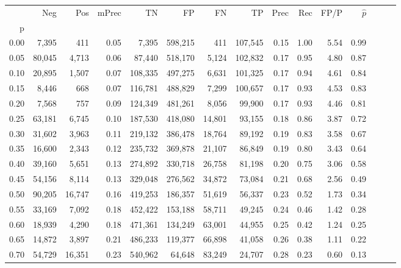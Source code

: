 \begin{tabular}{rrrrrrrrrrrrrrr}
\toprule
{} &     Neg &     Pos & mPrec &       TN &       FP &       FN &       TP &  Prec &   Rec &  FP/P & $\hat{p}$ \\
p    &         &         &       &          &          &          &          &       &       &       &           \\
\midrule
0.00 &   7,395 &     411 &  0.05 &    7,395 &  598,215 &      411 &  107,545 &  0.15 &  1.00 &  5.54 &      0.99 \\
0.05 &  80,045 &   4,713 &  0.06 &   87,440 &  518,170 &    5,124 &  102,832 &  0.17 &  0.95 &  4.80 &      0.87 \\
0.10 &  20,895 &   1,507 &  0.07 &  108,335 &  497,275 &    6,631 &  101,325 &  0.17 &  0.94 &  4.61 &      0.84 \\
0.15 &   8,446 &     668 &  0.07 &  116,781 &  488,829 &    7,299 &  100,657 &  0.17 &  0.93 &  4.53 &      0.83 \\
0.20 &   7,568 &     757 &  0.09 &  124,349 &  481,261 &    8,056 &   99,900 &  0.17 &  0.93 &  4.46 &      0.81 \\
0.25 &  63,181 &   6,745 &  0.10 &  187,530 &  418,080 &   14,801 &   93,155 &  0.18 &  0.86 &  3.87 &      0.72 \\
0.30 &  31,602 &   3,963 &  0.11 &  219,132 &  386,478 &   18,764 &   89,192 &  0.19 &  0.83 &  3.58 &      0.67 \\
0.35 &  16,600 &   2,343 &  0.12 &  235,732 &  369,878 &   21,107 &   86,849 &  0.19 &  0.80 &  3.43 &      0.64 \\
0.40 &  39,160 &   5,651 &  0.13 &  274,892 &  330,718 &   26,758 &   81,198 &  0.20 &  0.75 &  3.06 &      0.58 \\
0.45 &  54,156 &   8,114 &  0.13 &  329,048 &  276,562 &   34,872 &   73,084 &  0.21 &  0.68 &  2.56 &      0.49 \\
0.50 &  90,205 &  16,747 &  0.16 &  419,253 &  186,357 &   51,619 &   56,337 &  0.23 &  0.52 &  1.73 &      0.34 \\
0.55 &  33,169 &   7,092 &  0.18 &  452,422 &  153,188 &   58,711 &   49,245 &  0.24 &  0.46 &  1.42 &      0.28 \\
0.60 &  18,939 &   4,290 &  0.18 &  471,361 &  134,249 &   63,001 &   44,955 &  0.25 &  0.42 &  1.24 &      0.25 \\
0.65 &  14,872 &   3,897 &  0.21 &  486,233 &  119,377 &   66,898 &   41,058 &  0.26 &  0.38 &  1.11 &      0.22 \\
0.70 &  54,729 &  16,351 &  0.23 &  540,962 &   64,648 &   83,249 &   24,707 &  0.28 &  0.23 &  0.60 &      0.13 \\

\end{tabular}
